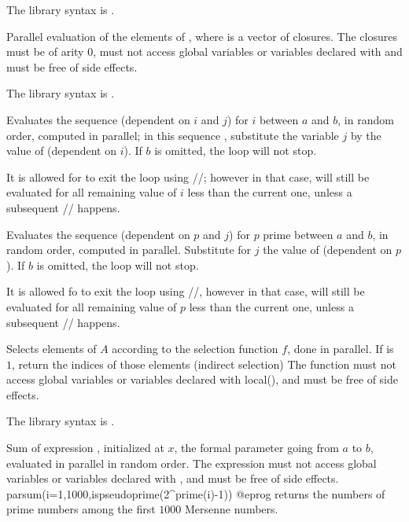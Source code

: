 The library syntax is .

\label{se:pareval}
Parallel evaluation of the elements of , where  is a
vector of closures. The closures must be of arity $0$, must not access
global variables or variables declared with  and must be
free of side effects.

The library syntax is .

\label{se:parfor}
Evaluates the sequence  (dependent on $i$ and $j$) for $i$
between $a$ and $b$, in random order, computed in parallel; in this sequence
, substitute the variable $j$ by the value of 
(dependent on $i$). If $b$ is omitted, the loop will not stop.

It is allowed for  to exit the loop using
//; however in that case,  will
still be evaluated for all remaining value of $i$ less than the current one,
unless a subsequent // happens.

\label{se:parforprime}
Evaluates the sequence  (dependent on $p$ and $j$) for $p$
prime between $a$ and $b$, in random order, computed in parallel. Substitute
for $j$ the value of  (dependent on $p$).
If $b$ is omitted, the loop will not stop.

It is allowed fo  to exit the loop using
//, however in that case,  will
still be evaluated for all remaining value of $p$ less than the current one,
unless a subsequent // happens.

\label{se:parselect}
Selects elements of $A$ according to the selection function $f$, done in
parallel.  If \fl is $1$, return the indices of those elements (indirect
selection) The function  must not access global variables or
variables declared with local(), and must be free of side effects.

The library syntax is .

\label{se:parsum}
Sum of expression , initialized at $x$, the formal parameter
going from $a$ to $b$, evaluated in parallel in random order.
The expression  must not access global variables or
variables declared with , and must be free of side effects.
\bprog
parsum(i=1,1000,ispseudoprime(2^prime(i)-1))
@eprog
returns the numbers of prime numbers among the first $1000$ Mersenne numbers.

